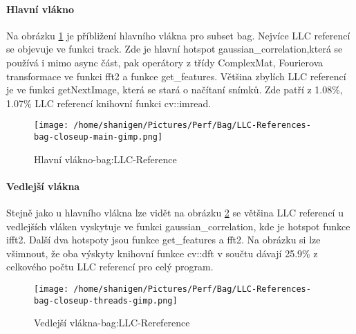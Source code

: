 \documentclass{article}
\begin{document}
\paragraph{Hlavní vlákno}
Na obrázku \ref{LLC-References-main} je příbližení hlavního vlákna pro subset bag. Nejvíce LLC referencí se objevuje ve funkci track. Zde je hlavní hotspot gaussian\_correlation,která se používá i mimo async část, pak operátory z třídy ComplexMat, Fourierova transformace ve funkci fft2 a funkce get\_features. Většina zbylích LLC referencí je ve funkci getNextImage, která se stará o načítaní snímků. Zde patří z 1.08\%, 1.07\% LLC referencí knihovní funkci cv::imread.
\begin{figure}[h]
	\centering
	\texttt{[image: /home/shanigen/Pictures/Perf/Bag/LLC-References-bag-closeup-main-gimp.png]}
	\caption{Hlavní vlákno-bag:LLC-Reference}
	\label{LLC-References-main}
\end{figure}
\paragraph{Vedlejší vlákna}
Stejně jako u hlavního vlákna lze vidět na obrázku \ref{LLC-References-threads} se většina LLC referencí u vedlejších vláken vyskytuje ve funkci gaussian\_correlation, kde je hotspot funkce ifft2. Další dva hotspoty jsou funkce get\_features a fft2. Na obrázku si lze všimnout, že oba výskyty knihovní funkce cv::dft v součtu dávají 25.9\% z celkového počtu LLC referencí pro celý program.
\begin{figure}[h!]
	\centering
	\texttt{[image: /home/shanigen/Pictures/Perf/Bag/LLC-References-bag-closeup-threads-gimp.png]}
	\caption{Vedlejší vlákna-bag:LLC-Rereference}
	\label{LLC-References-threads}
\end{figure}
\newpage
\end{document}
